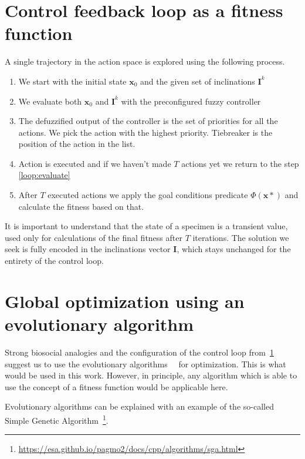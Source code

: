 \documentclass[12pt, a4paper]{report}
\begin{document}
	\section{Control feedback loop as a fitness function}\label{fitness}

	A single trajectory in the action space is explored using the following process.

	\begin{enumerate}
		\item We start with the initial state $\mathbf{x}_0$ and the given set of inclinations $\mathbf{I}^k$
		\item\label{loop:evaluate} We evaluate both $\mathbf{x}_0$ and $\mathbf{I}^k$ with the preconfigured fuzzy controller
		\item The defuzzified output of the controller is the set of priorities for all the  actions. We pick the action with the highest priority. Tiebreaker is the position of the action in the list.
		\item Action is executed and if we haven't made $T$ actions yet we return to the step \ref{loop:evaluate}
		\item After $T$ executed actions we apply the goal conditions predicate $\Phi(\mathbf{x}*)$ and calculate the fitness based on that.
	\end{enumerate}

  It is important to understand that the state of a specimen is a transient value, used only for calculations of the final fitness after $T$ iterations.
  The solution we seek is fully encoded in the inclinations vector $\mathbf{I}$, which stays unchanged for the entirety of the control loop.

	\section{Global optimization using an evolutionary algorithm}\label{section::evolutionary}

	Strong biosocial analogies and the configuration of the control loop from~\ref{fitness} suggest us to use the evolutionary algorithms~\cite{song2023rl_ea}~\cite{beyer2002evolution_strategies} for optimization.
	This is what would be used in this work.
	However, in principle, any algorithm which is able to use the concept of a fitness function would be applicable here.

  Evolutionary algorithms can be explained with an example of the so-called Simple Genetic Algorithm~\footnote{\url{https://esa.github.io/pagmo2/docs/cpp/algorithms/sga.html}}.
\end{document}
